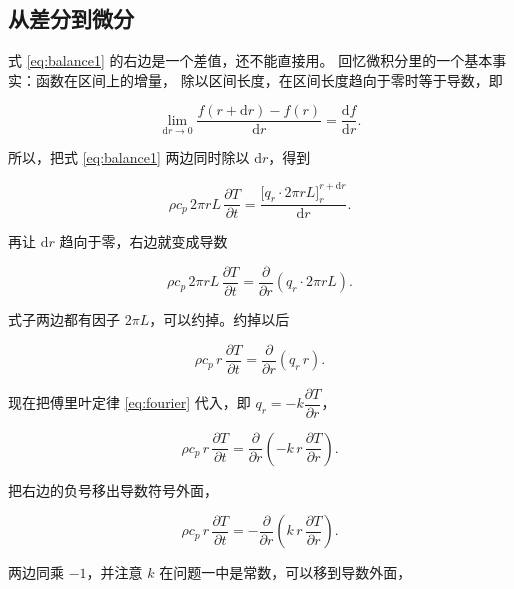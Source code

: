 \subsection{从差分到微分}

式 \eqref{eq:balance1} 的右边是一个差值，还不能直接用。
回忆微积分里的一个基本事实：函数在区间上的增量，
除以区间长度，在区间长度趋向于零时等于导数，即

\begin{equation}
\lim_{\mathrm{d}r\to0}\frac{f(r+\mathrm{d}r)-f(r)}{\mathrm{d}r} = \frac{\mathrm{d}f}{\mathrm{d}r}.
\end{equation}

所以，把式 \eqref{eq:balance1} 两边同时除以 $\mathrm{d}r$，得到

\begin{equation}
\rho c_p\,2\pi r L\,\frac{\partial T}{\partial t}
= \frac{\Big[q_r\cdot 2\pi rL\Big]_{r}^{r+\mathrm{d}r}}{\mathrm{d}r}.
\end{equation}

再让 $\mathrm{d}r$ 趋向于零，右边就变成导数

\begin{equation}
\rho c_p\,2\pi r L\,\frac{\partial T}{\partial t}
= \frac{\partial}{\partial r}\left(q_r\cdot 2\pi rL\right).
\end{equation}

式子两边都有因子 $2\pi L$，可以约掉。约掉以后

\begin{equation}
\rho c_p\,r\,\frac{\partial T}{\partial t}
= \frac{\partial}{\partial r}\left(q_r\,r\right).
\label{eq:balance2}
\end{equation}

现在把傅里叶定律 \eqref{eq:fourier} 代入，即 $q_r=-k\dfrac{\partial T}{\partial r}$，

\begin{equation}
\rho c_p\,r\,\frac{\partial T}{\partial t}
= \frac{\partial}{\partial r}\left(-k\,r\,\frac{\partial T}{\partial r}\right).
\end{equation}

把右边的负号移出导数符号外面，

\begin{equation}
\rho c_p\,r\,\frac{\partial T}{\partial t}
= -\frac{\partial}{\partial r}\left(k\,r\,\frac{\partial T}{\partial r}\right).
\end{equation}

两边同乘 $-1$，并注意 $k$ 在问题一中是常数，可以移到导数外面，

